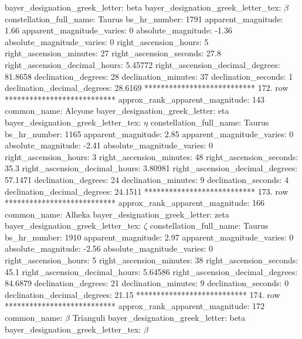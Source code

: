     bayer_designation_greek_letter: beta
bayer_designation_greek_letter_tex: $\beta$
           constellation_full_name: Taurus
                      bs_hr_number: 1791
                apparent_magnitude: 1.66
         apparent_magnitude_varies: 0
                absolute_magnitude: -1.36
         absolute_magnitude_varies: 0
             right_ascension_hours: 5
           right_ascension_minutes: 27
           right_ascension_seconds: 27.8
     right_ascension_decimal_hours: 5.45772
   right_ascension_decimal_degrees: 81.8658
               declination_degrees: 28
               declination_minutes: 37
               declination_seconds: 1
       declination_decimal_degrees: 28.6169
*************************** 172. row ***************************
    approx_rank_apparent_magnitude: 143
                       common_name: Alcyone
    bayer_designation_greek_letter: eta
bayer_designation_greek_letter_tex: $\eta$
           constellation_full_name: Taurus
                      bs_hr_number: 1165
                apparent_magnitude: 2.85
         apparent_magnitude_varies: 0
                absolute_magnitude: -2.41
         absolute_magnitude_varies: 0
             right_ascension_hours: 3
           right_ascension_minutes: 48
           right_ascension_seconds: 35.3
     right_ascension_decimal_hours: 3.80981
   right_ascension_decimal_degrees: 57.1471
               declination_degrees: 24
               declination_minutes: 9
               declination_seconds: 4
       declination_decimal_degrees: 24.1511
*************************** 173. row ***************************
    approx_rank_apparent_magnitude: 166
                       common_name: Alheka
    bayer_designation_greek_letter: zeta
bayer_designation_greek_letter_tex: $\zeta$
           constellation_full_name: Taurus
                      bs_hr_number: 1910
                apparent_magnitude: 2.97
         apparent_magnitude_varies: 0
                absolute_magnitude: -2.56
         absolute_magnitude_varies: 0
             right_ascension_hours: 5
           right_ascension_minutes: 38
           right_ascension_seconds: 45.1
     right_ascension_decimal_hours: 5.64586
   right_ascension_decimal_degrees: 84.6879
               declination_degrees: 21
               declination_minutes: 9
               declination_seconds: 0
       declination_decimal_degrees: 21.15
*************************** 174. row ***************************
    approx_rank_apparent_magnitude: 172
                       common_name: $\beta$ Trianguli
    bayer_designation_greek_letter: beta
bayer_designation_greek_letter_tex: $\beta$
